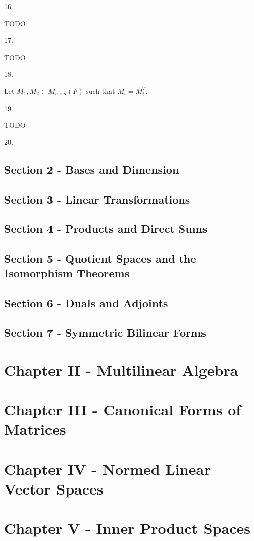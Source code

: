 \documentclass[letterpaper,11pt]{article}
\theoremstyle{definition}
\begin{document}
\begin{flushleft}
	16.
\end{flushleft}
TODO
\hrulefill

\begin{flushleft}
	17.
\end{flushleft}
TODO
\hrulefill

\begin{flushleft}
	18.
\end{flushleft}

Let $M_1, M_2 \in M_{n \times n}(F)$ such that $M_i = M_i^T$. 

\hrulefill

\begin{flushleft}
	19.
\end{flushleft}
TODO
\hrulefill

\begin{flushleft}
	20.
\end{flushleft}




\subsection*{Section 2 - Bases and Dimension}
\subsection*{Section 3 - Linear Transformations}
\subsection*{Section 4 - Products and Direct Sums}
\subsection*{Section 5 - Quotient Spaces and the Isomorphism Theorems}
\subsection*{Section 6 - Duals and Adjoints}
\subsection*{Section 7 - Symmetric Bilinear Forms}



\pagebreak
\section*{Chapter II - Multilinear Algebra}

\pagebreak
\section*{Chapter III - Canonical Forms of Matrices}

\pagebreak
\section*{Chapter IV - Normed Linear Vector Spaces}

\pagebreak
\section*{Chapter V - Inner Product Spaces}
\end{document}
